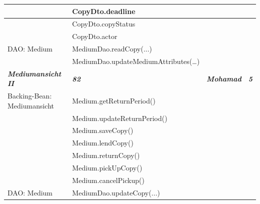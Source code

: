\documentclass{article}
\begin{document}
\begin{longtable}{|l|l|l|l|}
\hline
                                        & CopyDto.deadline                         &                             &                        \\ 
\hline
                                        & CopyDto.copyStatus                       &                             &                        \\ 
\hline
                                        & CopyDto.actor                            &                             &                        \\ 
\hline
DAO: Medium                             & MediumDao.readCopy(...)                  &                             &                        \\ 
\hline
                                        & MediumDao.updateMediumAttributes(…)      &                             &                        \\ 
\hline
\textbf{\textit{Mediumansicht II}}      & \textbf{\textit{82}}                     & \textbf{\textit{Mohamad}}   & \textbf{\textit{5}}    \\ 
\hline
Backing-Bean: Mediumansicht             & Medium.getReturnPeriod()                 &                             &                        \\ 
\hline
                                        & Medium.updateReturnPeriod()              &                             &                        \\ 
\hline
                                        & Medium.saveCopy()                        &                             &                        \\ 
\hline
                                        & Medium.lendCopy()                        &                             &                        \\ 
\hline
                                        & Medium.returnCopy()                      &                             &                        \\ 
\hline
                                        & Medium.pickUpCopy()                      &                             &                        \\ 
\hline
                                        & Medium.cancelPickup()                    &                             &                        \\ 
\hline
DAO: Medium                             & MediumDao.updateCopy(...)                &                             &                        \\ 

\end{longtable}
\end{document}
